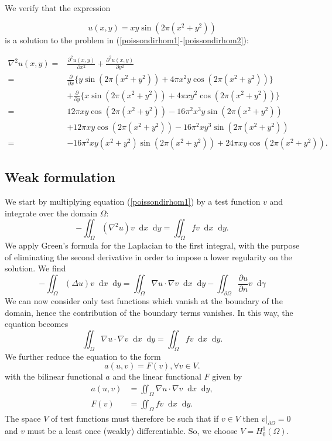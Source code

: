 \documentclass{report}
\renewcommand*\d{\mathop{}\!\mathrm{d}}
\begin{document}
We verify that the expression

\begin{equation} \label{poissonsol}
	u(x,y)=xy \sin (2\pi (x^2 + y^2))
\end{equation}
is a solution to the problem in (\ref{poissondirhom1}-\ref{poissondirhom2}):

\begin{align}
	\nabla^2 u(x,y) =& \frac{\partial^2 u(x,y)}{\partial x^2} + \frac{\partial^2 u(x,y)}{\partial y^2} \\
	=& \frac{\partial}{\partial x}\{y \sin (2\pi (x^2 + y^2)) +4\pi x^2 y \cos (2\pi (x^2 + y^2))\} \\
	& + \frac{\partial}{\partial y}\{x \sin (2\pi (x^2 + y^2)) +4\pi x y^2 \cos (2\pi (x^2 + y^2))\} \\
	=& 12\pi xy \cos (2\pi (x^2 + y^2)) - 16\pi^2 x^3 y\sin (2\pi (x^2 + y^2)) \\
	& + 12\pi xy \cos (2\pi (x^2 + y^2)) - 16\pi^2 x y^3 \sin (2\pi (x^2 + y^2)) \\
	=& -16\pi^2 xy (x^2 + y^2) \sin (2\pi (x^2 + y^2)) + 24\pi xy \cos (2\pi (x^2 + y^2)).
\end{align}


\subsection{Weak formulation}

We start by multiplying equation (\ref{poissondirhom1}) by a test function $v$ and integrate over the domain $\Omega$:
\begin{equation}
-\iint_{\Omega} (\nabla^2 u) v \d x \d y = \iint_{\Omega}fv \d x \d y.
\end{equation}
We apply Green's formula for the Laplacian to the first integral, with the purpose of eliminating the second derivative in order to impose a lower regularity on the solution. We find
\begin{equation}
-\iint_{\Omega} (\Delta u) v \d x \d y = \iint_{\Omega}\nabla u \cdot \nabla v \d x \d y -  \iint_{\partial \Omega} \frac{\partial u}{\partial n} v \d\gamma  
\end{equation}
We can now consider only test functions which vanish at the boundary of the domain, hence the contribution of the boundary terms vanishes. In this way, the equation becomes
\begin{equation}
\iint_{\Omega} \nabla u \cdot \nabla v \d x \d y = \iint_{\Omega}fv \d x \d y.
\end{equation}
We further reduce the equation to the form
\begin{equation}
	a(u,v) = F(v), \forall v \in V.
\end{equation}
with the bilinear functional $a$ and the linear functional $F$ given by
\begin{align}
	a(u,v) &=  \iint_{\Omega} \nabla u \cdot \nabla v \d x \d y, \\
	F(v) &= \iint_{\Omega}fv \d x \d y.
\end{align}
The space $V$ of test functions must therefore be such that if $v \in V$ then $v |_{\partial \Omega} = 0$ and $v$ must be a least once (weakly) differentiable. So, we choose $V = H_0^1(\Omega)$.
\end{document}
